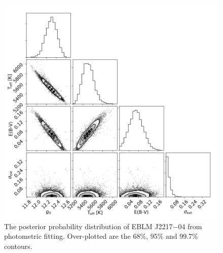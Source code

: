 \begin{figure}
    \centering
    \includegraphics[scale=0.5]{Appendix/SED_fits/J2217-04.png}
    \caption{The posterior probability distribution of EBLM J2217$-$04 from photometric fitting. Over-plotted are the 68\%, 95\% and 99.7\% contours.}
    \label{methods:fig:SED_J2217-04}
\end{figure}

